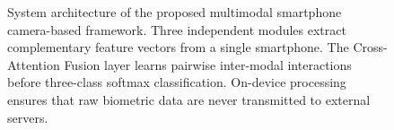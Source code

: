 \begin{figure}[t]
\caption{System architecture of the proposed multimodal smartphone camera-based framework.
Three independent modules extract complementary feature vectors from a single smartphone.
The Cross-Attention Fusion layer learns pairwise inter-modal interactions before
three-class softmax classification. On-device processing ensures that raw biometric
data are never transmitted to external servers.}
\label{fig:arch}
\end{figure}


%
